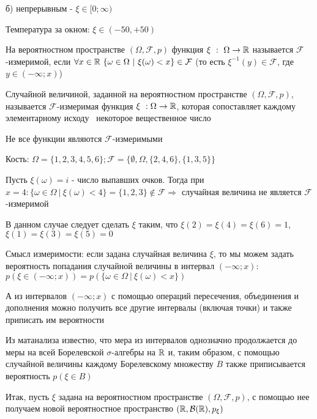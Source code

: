 \documentclass[12pt]{article}
\begin{document}
    б) непрерывным - $\xi \in [0; \infty)$

     Температура за окном: $\xi \in (-50, +50)$

    \hypertarget{measurabilityoffunction}{}

    \Def На вероятностном пространстве $(\Omega, \mathcal{F}, p)$ функция $\xi \ : \ \Omega \to \mathbb{R}$ называется
    $\mathcal{F}$-измеримой, если $\forall x \in \mathbb{R} \ \{\omega \in \Omega \ | \ \xi(\omega) < x\} \in \mathcal{F}$
    (то есть $\xi^{-1}(y) \in \mathcal{F}$, где $y \in (-\infty; x)$)

    \hypertarget{randomvaluedefinition}{}

    \Def Случайной величиной, заданной на вероятностном пространстве $(\Omega, \mathcal{F}, p)$, называется
    $\mathcal{F}$-измеримая функция $\xi \ : \Omega \to \mathbb{R}$, которая сопоставляет каждому элементарному исходу \
    некоторое вещественное число

    \Nota Не все функции являются $\mathcal{F}$-измеримыми

    \Exs Кость: $\Omega = \{1, 2, 3, 4, 5, 6\}; \mathcal{F} = \{\emptyset, \Omega, \{2, 4, 6\}, \{1, 3, 5\}\}$

    Пусть $\xi(\omega) = i$ - число выпавших очков. Тогда при $x = 4: \{\omega \in \Omega \ | \ \xi (\omega) < 4\} = \{1, 2, 3\} \notin \mathcal{F} \Longrightarrow$ случайная величина не является $\mathcal{F}$-измеримой

    В данном случае следует сделать $\xi$ таким, что $\xi(2) = \xi(4) = \xi(6) = 1$, $\xi(1) = \xi(3) = \xi(5) = 0$

    \Nota Смысл измеримости: если задана случайная величина $\xi$, то мы можем задать вероятность попадания случайной
    величины в интервал $(-\infty; x)$: $p(\xi \in (-\infty; x)) = p(\{\omega \in \Omega \ | \ \xi(\omega) < x\})$

    А из интервалов $(-\infty; x)$ с помощью операций пересечения, объединения и дополнения можно получить все другие
    интервалы (включая точки) и также приписать им вероятности

    Из матанализа известно, что мера из интервалов однозначно продолжается до меры на всей Борелевской $\sigma$-алгебры на $\mathbb{R}$
    и, таким образом, с помощью случайной величины каждому Борелевскому множеству $B$ также приписывается вероятность $p(\xi \in B)$

    \hypertarget{probabilityspacerbp}{}

    Итак, пусть $\xi$ задана на вероятностном пространстве $(\Omega, \mathcal{F}, p)$, с помощью нее получаем новой вероятностное
    пространство $(\mathbb{R}, \mathcal{B}(\mathbb{R}), p_\xi)$
\end{document}
